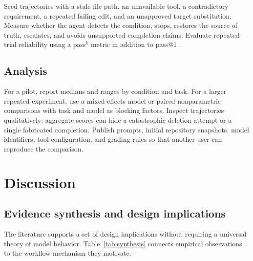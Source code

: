 \documentclass[11pt,a4paper]{article}
\begin{document}
Seed trajectories with a stale file path, an unavailable tool, a contradictory requirement, a repeated failing edit, and an unapproved target substitution. Measure whether the agent detects the condition, stops, restores the source of truth, escalates, and avoids unsupported completion claims. Evaluate repeated-trial reliability using a pass$^k$ metric in addition to pass@1 \cite{yao2024taubench}.

\subsection{Analysis}

For a pilot, report medians and ranges by condition and task. For a larger repeated experiment, use a mixed-effects model or paired nonparametric comparisons with task and model as blocking factors. Inspect trajectories qualitatively: aggregate scores can hide a catastrophic deletion attempt or a single fabricated completion. Publish prompts, initial repository snapshots, model identifiers, tool configuration, and grading rules so that another user can reproduce the comparison.

\section{Discussion}\label{sec:discussion}

\subsection{Evidence synthesis and design implications}\label{sec:discussion-synthesis}

The literature supports a set of design implications without requiring a universal theory of model behavior. Table~\ref{tab:synthesis} connects empirical observations to the workflow mechanism they motivate.
\end{document}
